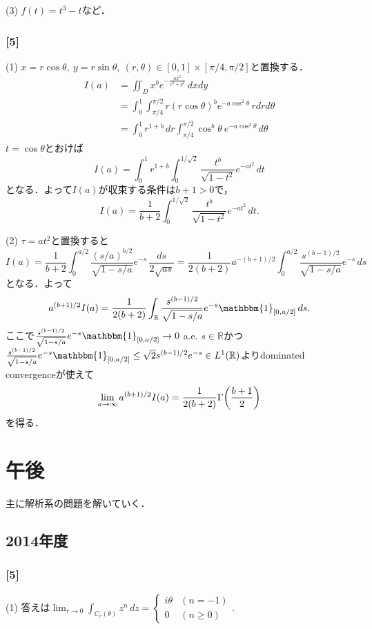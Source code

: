 \documentclass[a4j]{ltjsarticle}
\newcommand{\Rset}{\mathbb{R}}
\newcommand{\1}{\mathbbm{1}}
\numberwithin{equation}{section}
\theoremstyle{definition}
\begin{document}
(3) $f(t)=t^3-t$など．
\subsubsection*{[5]}
(1) $x=r\cos\theta,\ y=r\sin\theta,\ (r,\theta)\in[0,1]\times[\pi/4,\pi/2]$と置換する．
\begin{align}
    I(a)&=\iint_{D}x^be^{-\frac{ax^2}{x^2+y^2}}\,dxdy\\
    &=\int_{0}^{1}\int_{\pi/4}^{\pi/2} r(r\cos\theta)^be^{-a\cos^2\theta}\,rdrd\theta\\
    &=\int_{0}^{1}r^{1+b}\,dr\int_{\pi/4}^{\pi/2}\cos^b\theta\ e^{-a\cos^2\theta}\,d\theta
\end{align}
$t=\cos\theta$とおけば
\begin{equation}
    I(a)=\int_{0}^{1}r^{1+b}\int_{0}^{1/\sqrt{2}}\frac{t^b}{\sqrt{1-t^2}}e^{-at^2}\,dt 
\end{equation}
となる．よって$I(a)$が収束する条件は$b+1>0$で，
\begin{equation}
    I(a)=\frac{1}{b+2}\int_{0}^{1/\sqrt{2}}\frac{t^b}{\sqrt{1-t^2}}e^{-at^2}\,dt .
\end{equation}

(2) $\tau=at^2$と置換すると
\begin{equation}
    I(a)=\frac{1}{b+2}\int_{0}^{a/2}\frac{(s/a)^{b/2}}{\sqrt{1-s/a}}e^{-s}\,\frac{ds}{2\sqrt{as}}=\frac{1}{2(b+2)}a^{-(b+1)/2}\int_{0}^{a/2}\frac{s^{(b-1)/2}}{\sqrt{1-s/a}}e^{-s}\,ds 
\end{equation}
となる．よって
\begin{equation}
    a^{(b+1)/2}I(a)=\frac{1}{2(b+2)}\int_{\Rset}\frac{s^{(b-1)/2}}{\sqrt{1-s/a}}e^{-s}\1_{[0,a/2]}\,ds.
\end{equation}
ここで$\frac{s^{(b-1)/2}}{\sqrt{1-s/a}}e^{-s}\1_{[0,a/2]}\to0\ $a.e. $s\in\Rset$かつ$\frac{s^{(b-1)/2}}{\sqrt{1-s/a}}e^{-s}\1_{[0,a/2]}\leq \sqrt{2}s^{(b-1)/2}e^{-s}\in L^1(\Rset)$よりdominated convergenceが使えて
\begin{equation}
    \lim_{a\to\infty}a^{(b+1)/2}I(a)=\frac{1}{2(b+2)}\Gamma\qty(\frac{b+1}{2})
\end{equation}
を得る．
\section{午後}
主に解析系の問題を解いていく．
\subsection{2014年度}
\subsubsection*{[5]}
(1) 答えは$\lim_{r\to 0}\int_{C_r(\theta)}z^n\,dz=\begin{cases}
    i\theta & (n=-1)\\
    0 & (n\geq0)
\end{cases}$.
\end{document}
